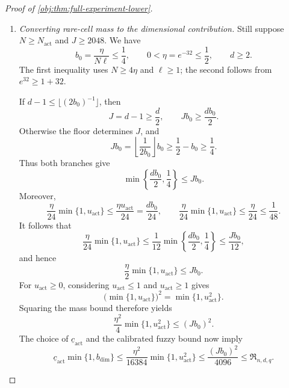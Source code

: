 \documentclass[11pt]{article}
\begin{document}
\begin{proof}[Proof of \cref{obj:thm:full-experiment-lower}]
\begin{enumerate}
Define the nearer-center test
\[
\psi_{\mathrm{act}}(o)
=
\mathbf1\left\{
|b_{\mathsf T}(o)-\theta_{\mathrm{act},1}|
\le
|b_{\mathsf T}(o)-\theta_{\mathrm{act},0}|
\right\}.
\]
The triangle inequality shows that a testing error under center \(\iota\)
entails
\[
|b_{\mathsf T}(o)-\theta_{\mathrm{act},\iota}|
\ge\frac{\Delta_{\mathrm{act}}}{2}.
\]
By \cref{obj:lem:randomized-kernel-tv-comparison},
\[
Q_{\mathrm{act},0}(\psi_{\mathrm{act}}=1)
+
Q_{\mathrm{act},1}(\psi_{\mathrm{act}}=0)
\ge
1-\operatorname{TV}(Q_{\mathrm{act},0},Q_{\mathrm{act},1}).
\]
Bounding each error probability by its centered squared risk consequently
gives
\[
\frac{\Delta_{\mathrm{act}}^2}{8}
\left[
1-\operatorname{TV}(Q_{\mathrm{act},0},Q_{\mathrm{act},1})
\right]
\le
\max_{\iota\in\{0,1\}}C_{\mathrm{act},\iota}(\mathsf T).
\]
Together with the total variation and centered-risk bounds, this implies
\[
\frac{7\Delta_{\mathrm{act}}^2}{128}
-\frac{Jb_0^2}{4}
\le\mathcal W(\mathsf T).
\]
Now \(J\ge2048\) and \(\Delta_{\mathrm{act}}\ge Jb_0/12\), so
\[
\mathcal W(\mathsf T)
\ge
(Jb_0)^2
\left(\frac7{18432}-\frac1{4J}\right)
\ge\frac{(Jb_0)^2}{4096}.
\]
Taking the infimum over \(\mathsf T\) gives the calibrated fuzzy bound
\[
\frac{(Jb_0)^2}{4096}\le\mathfrak R_{n,d,q}.
\]

\item \emph{Converting rare-cell mass to the dimensional contribution.}
Still suppose \(N\ge N_{\mathrm{act}}\) and \(J\ge2048\). We have
\[
b_0=\frac{\eta}{N\ell}\le\frac14,
\qquad
0<\eta=e^{-32}\le\frac12,
\qquad d\ge2.
\]
The first inequality uses \(N\ge4\eta\) and \(\ell\ge1\); the second follows
from \(e^{32}\ge1+32\).

If \(d-1\le\lfloor(2b_0)^{-1}\rfloor\), then
\[
J=d-1\ge\frac d2,\qquad Jb_0\ge\frac{db_0}{2}.
\]
Otherwise the floor determines \(J\), and
\[
Jb_0
=\left\lfloor\frac1{2b_0}\right\rfloor b_0
\ge\frac12-b_0\ge\frac14.
\]
Thus both branches give
\[
\min\left\{\frac{db_0}{2},\frac14\right\}\le Jb_0.
\]
Moreover,
\[
\frac{\eta}{24}\min\{1,u_{\mathrm{act}}\}
\le\frac{\eta u_{\mathrm{act}}}{24}
=\frac{db_0}{24},
\qquad
\frac{\eta}{24}\min\{1,u_{\mathrm{act}}\}
\le\frac{\eta}{24}\le\frac1{48}.
\]
It follows that
\[
\frac{\eta}{24}\min\{1,u_{\mathrm{act}}\}
\le
\frac1{12}\min\left\{\frac{db_0}{2},\frac14\right\}
\le\frac{Jb_0}{12},
\]
and hence
\[
\frac{\eta}{2}\min\{1,u_{\mathrm{act}}\}\le Jb_0.
\]
For \(u_{\mathrm{act}}\ge0\), considering \(u_{\mathrm{act}}\le1\) and
\(u_{\mathrm{act}}\ge1\) gives
\[
\bigl(\min\{1,u_{\mathrm{act}}\}\bigr)^2
=\min\{1,u_{\mathrm{act}}^2\}.
\]
Squaring the mass bound therefore yields
\[
\frac{\eta^2}{4}\min\{1,u_{\mathrm{act}}^2\}
\le(Jb_0)^2.
\]
The choice of \(\underline c_{\mathrm{act}}\) and the calibrated fuzzy bound
now imply
\[
\underline c_{\mathrm{act}}\min\{1,b_{\mathrm{dim}}\}
\le
\frac{\eta^2}{16384}\min\{1,u_{\mathrm{act}}^2\}
\le\frac{(Jb_0)^2}{4096}
\le\mathfrak R_{n,d,q}.
\]


\end{enumerate}
\end{proof}
\end{document}
